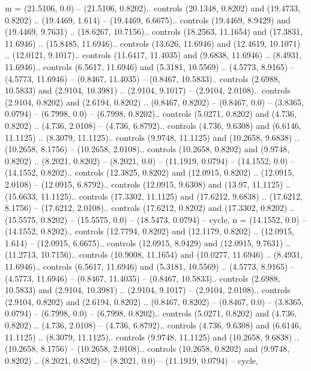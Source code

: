 {m} = {(21.5106, 0.0) -- (21.5106, 0.8202).. controls (20.1348, 0.8202) and (19.4733, 0.8202) .. (19.4469, 1.614) -- (19.4469, 6.6675).. controls (19.4469, 8.9429) and (19.4469, 9.7631) .. (18.6267, 10.7156).. controls (18.2563, 11.1654) and (17.3831, 11.6946) .. (15.8485, 11.6946).. controls (13.626, 11.6946) and (12.4619, 10.1071) .. (12.0121, 9.1017).. controls (11.6417, 11.4035) and (9.6838, 11.6946) .. (8.4931, 11.6946).. controls (6.5617, 11.6946) and (5.3181, 10.5569) .. (4.5773, 8.9165) -- (4.5773, 11.6946) -- (0.8467, 11.4035) -- (0.8467, 10.5833).. controls (2.6988, 10.5833) and (2.9104, 10.3981) .. (2.9104, 9.1017) -- (2.9104, 2.0108).. controls (2.9104, 0.8202) and (2.6194, 0.8202) .. (0.8467, 0.8202) -- (0.8467, 0.0) -- (3.8365, 0.0794) -- (6.7998, 0.0) -- (6.7998, 0.8202).. controls (5.0271, 0.8202) and (4.736, 0.8202) .. (4.736, 2.0108) -- (4.736, 6.8792).. controls (4.736, 9.6308) and (6.6146, 11.1125) .. (8.3079, 11.1125).. controls (9.9748, 11.1125) and (10.2658, 9.6838) .. (10.2658, 8.1756) -- (10.2658, 2.0108).. controls (10.2658, 0.8202) and (9.9748, 0.8202) .. (8.2021, 0.8202) -- (8.2021, 0.0) -- (11.1919, 0.0794) -- (14.1552, 0.0) -- (14.1552, 0.8202).. controls (12.3825, 0.8202) and (12.0915, 0.8202) .. (12.0915, 2.0108) -- (12.0915, 6.8792).. controls (12.0915, 9.6308) and (13.97, 11.1125) .. (15.6633, 11.1125).. controls (17.3302, 11.1125) and (17.6212, 9.6838) .. (17.6212, 8.1756) -- (17.6212, 2.0108).. controls (17.6212, 0.8202) and (17.3302, 0.8202) .. (15.5575, 0.8202) -- (15.5575, 0.0) -- (18.5473, 0.0794) -- cycle},
{n} = {(14.1552, 0.0) -- (14.1552, 0.8202).. controls (12.7794, 0.8202) and (12.1179, 0.8202) .. (12.0915, 1.614) -- (12.0915, 6.6675).. controls (12.0915, 8.9429) and (12.0915, 9.7631) .. (11.2713, 10.7156).. controls (10.9008, 11.1654) and (10.0277, 11.6946) .. (8.4931, 11.6946).. controls (6.5617, 11.6946) and (5.3181, 10.5569) .. (4.5773, 8.9165) -- (4.5773, 11.6946) -- (0.8467, 11.4035) -- (0.8467, 10.5833).. controls (2.6988, 10.5833) and (2.9104, 10.3981) .. (2.9104, 9.1017) -- (2.9104, 2.0108).. controls (2.9104, 0.8202) and (2.6194, 0.8202) .. (0.8467, 0.8202) -- (0.8467, 0.0) -- (3.8365, 0.0794) -- (6.7998, 0.0) -- (6.7998, 0.8202).. controls (5.0271, 0.8202) and (4.736, 0.8202) .. (4.736, 2.0108) -- (4.736, 6.8792).. controls (4.736, 9.6308) and (6.6146, 11.1125) .. (8.3079, 11.1125).. controls (9.9748, 11.1125) and (10.2658, 9.6838) .. (10.2658, 8.1756) -- (10.2658, 2.0108).. controls (10.2658, 0.8202) and (9.9748, 0.8202) .. (8.2021, 0.8202) -- (8.2021, 0.0) -- (11.1919, 0.0794) -- cycle},
